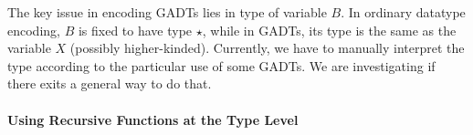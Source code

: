 The key issue in encoding GADTs lies in type of variable $B$. In
ordinary datatype encoding, $B$ is fixed to have type $\star$, while
in GADTs, its type is the same as the variable $X$ (possibly
higher-kinded). Currently, we have to manually interpret the type
according to the particular use of some GADTs. We are investigating if
there exits a general way to do that.

\paragraph{Using Recursive Functions at the Type Level}
